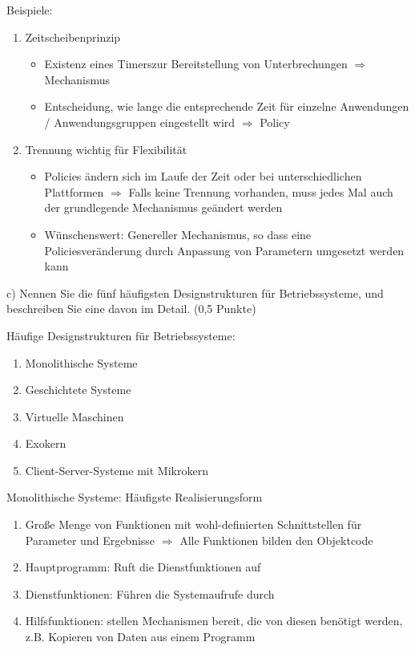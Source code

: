 \documentclass[a4paper,12pt]{article}
\begin{document}
\large Beispiele:
\normalsize
\begin{enumerate}
	\item Zeitscheibenprinzip
	\begin {itemize}
		\item Existenz eines Timerszur Bereitstellung von Unterbrechungen $\Rightarrow$ Mechanismus
		\item Entscheidung, wie lange die entsprechende Zeit für einzelne Anwendungen / Anwendungsgruppen eingestellt wird $\Rightarrow$ Policy
	\end{itemize}
\vspace{\baselineskip}
\vspace{\baselineskip}
	\item Trennung wichtig für Flexibilität
	\begin {itemize}
		\item Policies ändern sich im Laufe der Zeit oder bei unterschiedlichen Plattformen $\Rightarrow$  Falls keine Trennung vorhanden, muss jedes Mal auch der grundlegende Mechanismus geändert werden
		\item Wünschenswert: Genereller Mechanismus, so dass eine Policiesveränderung durch Anpassung von Parametern umgesetzt werden kann
	\end{itemize}
\end{enumerate}

\vspace{\baselineskip}
c) Nennen Sie die fünf häufigsten Designstrukturen für Betriebssysteme, und beschreiben Sie eine davon
im Detail. (0,5 Punkte)
\vspace{\baselineskip}

\large Häufige Designstrukturen für Betriebssysteme:
\normalsize
\begin{enumerate}
	\item Monolithische Systeme
	\item Geschichtete Systeme
	\item Virtuelle Maschinen
	\item Exokern
	\item Client-Server-Systeme mit Mikrokern
\end{enumerate}

 \vspace{\baselineskip}
 \large Monolithische Systeme: Häufigste Realisierungsform
 \normalsize
 \begin{enumerate}
 	\item Große Menge von Funktionen mit wohl-definierten Schnittstellen für Parameter und Ergebnisse $\Rightarrow$ Alle Funktionen bilden den Objektcode
 	\item Hauptprogramm: Ruft die Dienstfunktionen auf
 	\item Dienstfunktionen: Führen die Systemaufrufe durch
 	\item Hilfsfunktionen: stellen Mechanismen bereit, die von diesen benötigt werden, z.B. Kopieren von Daten aus einem Programm
 \end{enumerate}
\end{document}
